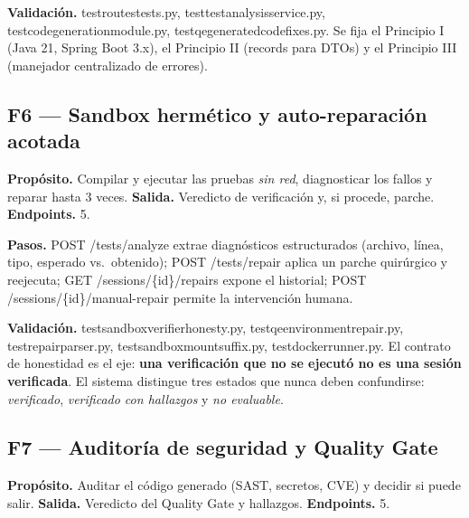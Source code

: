 \documentclass[11pt,a4paper]{article}
\newcommand{\code}[1]{{\ttfamily\small\def\_{\textunderscore\allowbreak}#1}}
\begin{document}
\noindent\textbf{Validación.} \code{test\_routes\_tests.py},
\code{test\_test\_analysis\_service.py}, \code{test\_code\_generation\_module.py},
\code{test\_qe\_generated\_code\_fixes.py}. Se fija el Principio I (Java 21, Spring Boot 3.x),
el Principio II (records para DTOs) y el Principio III (manejador centralizado de errores).

\subsection{F6 --- Sandbox hermético y auto-reparación acotada}

\begin{finding}
\textbf{Propósito.} Compilar y ejecutar las pruebas \emph{sin red}, diagnosticar los fallos y
reparar hasta 3 veces. \textbf{Salida.} Veredicto de verificación y, si procede, parche.
\textbf{Endpoints.} 5.
\end{finding}

\noindent\textbf{Pasos.} \code{POST /tests/analyze} extrae diagnósticos estructurados (archivo,
línea, tipo, esperado vs.\ obtenido); \code{POST /tests/repair} aplica un parche quirúrgico y
reejecuta; \code{GET /sessions/\{id\}/repairs} expone el historial;
\code{POST /sessions/\{id\}/manual-repair} permite la intervención humana.

\noindent\textbf{Validación.} \code{test\_sandbox\_verifier\_honesty.py},
\code{test\_qe\_environment\_repair.py}, \code{test\_repair\_parser.py},
\code{test\_sandbox\_mount\_suffix.py}, \code{test\_docker\_runner.py}. El contrato de honestidad
es el eje: \textbf{una verificación que no se ejecutó no es una sesión verificada}. El sistema
distingue tres estados que nunca deben confundirse: \emph{verificado}, \emph{verificado con
hallazgos} y \emph{no evaluable}.

\subsection{F7 --- Auditoría de seguridad y Quality Gate}

\begin{finding}
\textbf{Propósito.} Auditar el código generado (SAST, secretos, CVE) y decidir si puede salir.
\textbf{Salida.} Veredicto del Quality Gate y hallazgos. \textbf{Endpoints.} 5.
\end{finding}
\end{document}
